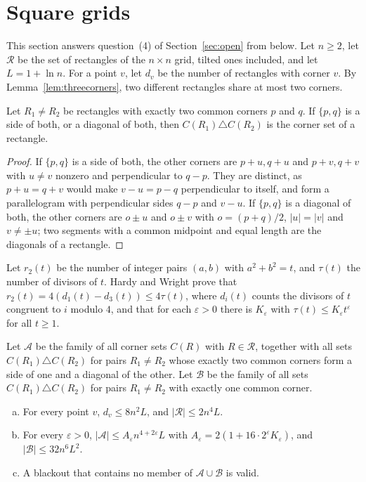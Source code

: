 \section{Square grids}\label{app:square}

This section answers question~(4) of Section~\ref{sec:open} from below. Let $n\ge2$, let $\mathcal R$ be the set of rectangles of the $n\times n$ grid, tilted ones included, and let $L=1+\ln n$. For a point $v$, let $d_v$ be the number of rectangles with corner $v$. By Lemma~\ref{lem:threecorners}, two different rectangles share at most two corners.

\begin{lemma}\label{lem:compress}
Let $R_1\ne R_2$ be rectangles with exactly two common corners $p$ and $q$. If $\{p,q\}$ is a side of both, or a diagonal of both, then $C(R_1)\triangle C(R_2)$ is the corner set of a rectangle.
\end{lemma}

\begin{proof}
If $\{p,q\}$ is a side of both, the other corners are $p+u,q+u$ and $p+v,q+v$ with $u\ne v$ nonzero and perpendicular to $q-p$. They are distinct, as $p+u=q+v$ would make $v-u=p-q$ perpendicular to itself, and form a parallelogram with perpendicular sides $q-p$ and $v-u$. If $\{p,q\}$ is a diagonal of both, the other corners are $o\pm u$ and $o\pm v$ with $o=(p+q)/2$, $|u|=|v|$ and $v\ne\pm u$; two segments with a common midpoint and equal length are the diagonals of a rectangle.
\end{proof}

Let $r_2(t)$ be the number of integer pairs $(a,b)$ with $a^2+b^2=t$, and $\tau(t)$ the number of divisors of $t$. Hardy and Wright \cite[Sections~16.9, 16.10, and~18.1]{hardywright2008} prove that $r_2(t)=4(d_1(t)-d_3(t))\le4\tau(t)$, where $d_i(t)$ counts the divisors of $t$ congruent to $i$ modulo $4$, and that for each $\varepsilon>0$ there is $K_\varepsilon$ with $\tau(t)\le K_\varepsilon t^\varepsilon$ for all $t\ge1$.

Let $\mathcal A$ be the family of all corner sets $C(R)$ with $R\in\mathcal R$, together with all sets $C(R_1)\triangle C(R_2)$ for pairs $R_1\ne R_2$ whose exactly two common corners form a side of one and a diagonal of the other. Let $\mathcal B$ be the family of all sets $C(R_1)\triangle C(R_2)$ for pairs $R_1\ne R_2$ with exactly one common corner.

\begin{lemma}\label{lem:counts}
\begin{enumerate}[(a)]
\item For every point $v$, $d_v\le8n^2L$, and $|\mathcal R|\le2n^4L$.
\item For every $\varepsilon>0$, $|\mathcal A|\le A_\varepsilon n^{4+2\varepsilon}L$ with $A_\varepsilon=2(1+16\cdot2^\varepsilon K_\varepsilon)$, and $|\mathcal B|\le32n^6L^2$.
\item A blackout that contains no member of $\mathcal A\cup\mathcal B$ is valid.
\end{enumerate}
\end{lemma}

